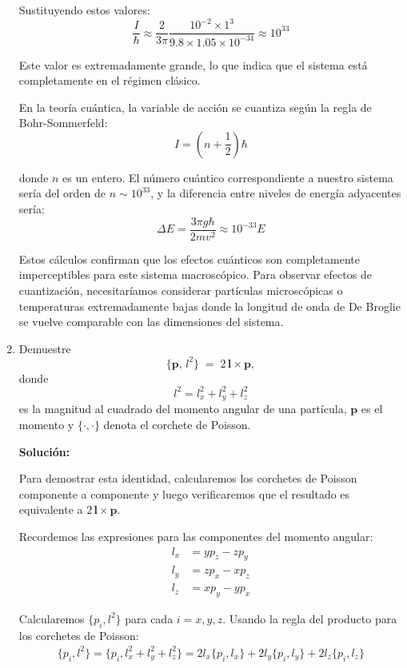 \documentclass[12pt]{article}
\begin{document}
\begin{enumerate}
  Sustituyendo estos valores:
  \[
  \frac{I}{\hbar} \approx \frac{2}{3\pi}\frac{10^{-2} \times 1^3}{9.8 \times 1.05 \times 10^{-34}} \approx 10^{33}
  \]

  Este valor es extremadamente grande, lo que indica que el sistema está completamente en el régimen clásico.

  En la teoría cuántica, la variable de acción se cuantiza según la regla de Bohr-Sommerfeld:
  \[
  I = \left(n + \frac{1}{2}\right)\hbar
  \]

  donde $n$ es un entero. El número cuántico correspondiente a nuestro sistema sería del orden de $n \sim 10^{33}$, y la diferencia entre niveles de energía adyacentes sería:
  \[
  \Delta E = \frac{3\pi g\hbar}{2mv^2} \approx 10^{-33} E
  \]

  Estos cálculos confirman que los efectos cuánticos son completamente imperceptibles para este sistema macroscópico. Para observar efectos de cuantización, necesitaríamos considerar partículas microscópicas o temperaturas extremadamente bajas donde la longitud de onda de De Broglie se vuelve comparable con las dimensiones del sistema.

  \item Demuestre
    \[
      \{\mathbf{p},\,l^2\} \;=\; 2\,\mathbf{l}\times\mathbf{p},
    \]
    donde
    \[
      l^2 = l_x^2 + l_y^2 + l_z^2
    \]
    es la magnitud al cuadrado del momento angular de una partícula, 
    \(\mathbf{p}\) es el momento y \(\{\cdot,\cdot\}\) denota el corchete de Poisson.

  \textbf{Solución:}

  Para demostrar esta identidad, calcularemos los corchetes de Poisson componente a componente y luego verificaremos que el resultado es equivalente a $2\,\mathbf{l}\times\mathbf{p}$.

  Recordemos las expresiones para las componentes del momento angular:
  \begin{align}
  l_x &= yp_z - zp_y\\
  l_y &= zp_x - xp_z\\
  l_z &= xp_y - yp_x
  \end{align}

  Calcularemos $\{p_i, l^2\}$ para cada $i=x,y,z$. Usando la regla del producto para los corchetes de Poisson:
  \begin{align}
  \{p_i, l^2\} = \{p_i, l_x^2 + l_y^2 + l_z^2\} = 2l_x\{p_i, l_x\} + 2l_y\{p_i, l_y\} + 2l_z\{p_i, l_z\}
  \end{align}


\end{enumerate}
\end{document}
